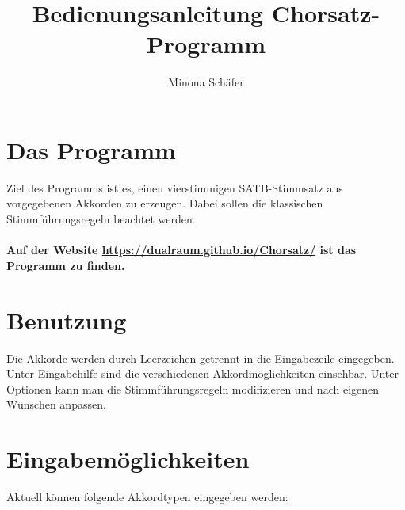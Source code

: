 \documentclass[11.5pt,a4paper]{article}
\title{Bedienungsanleitung Chorsatz-Programm}
\author{Minona Schäfer}
\date{ }
\begin{document}
\maketitle

\tableofcontents
	
\section{Das Programm}
Ziel des Programms ist es, einen vierstimmigen SATB-Stimmsatz aus vorgegebenen Akkorden zu erzeugen. Dabei sollen die klassischen Stimmführungsregeln beachtet werden.\\
\\
\textbf{Auf der Website \url{https://dualraum.github.io/Chorsatz/} ist das Programm zu finden. }

\section{Benutzung}
Die Akkorde werden durch Leerzeichen getrennt in die Eingabezeile eingegeben. Unter Eingabehilfe sind die verschiedenen Akkordmöglichkeiten einsehbar. Unter Optionen kann man die Stimmführungsregeln modifizieren und nach eigenen Wünschen anpassen.

\section{Eingabemöglichkeiten}\label{Eingabe}
	Aktuell können folgende Akkordtypen eingegeben werden: 
	
\end{document}
